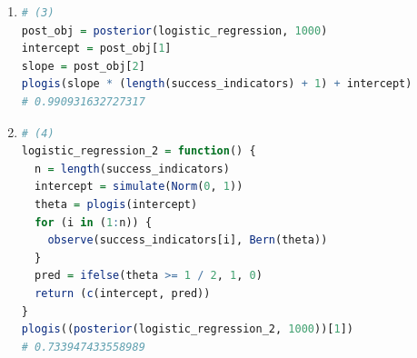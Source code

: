 \documentclass{article}
\begin{document}
\begin{enumerate}
\item 
\begin{lstlisting}[language=R]
# (3)
post_obj = posterior(logistic_regression, 1000)
intercept = post_obj[1]
slope = post_obj[2]
plogis(slope * (length(success_indicators) + 1) + intercept)
# 0.990931632727317
\end{lstlisting}



\item 
\begin{lstlisting}[language=R]
# (4)
logistic_regression_2 = function() {
  n = length(success_indicators)
  intercept = simulate(Norm(0, 1))
  theta = plogis(intercept)
  for (i in (1:n)) {
    observe(success_indicators[i], Bern(theta))
  }
  pred = ifelse(theta >= 1 / 2, 1, 0)
  return (c(intercept, pred))
}
plogis((posterior(logistic_regression_2, 1000))[1])
# 0.733947433558989
\end{lstlisting}





\end{enumerate}













 
\end{document}
